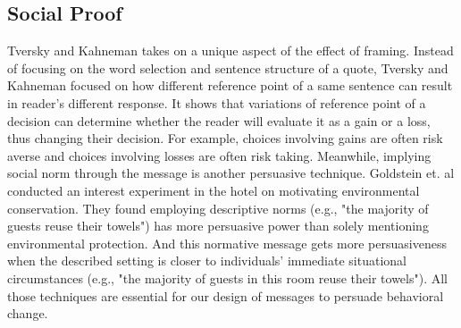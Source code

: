 \subsection{Social Proof}
Tversky and Kahneman takes on a unique aspect of the effect of framing. Instead of focusing on the word selection and sentence structure of a quote, Tversky and Kahneman focused on how different reference point of a same sentence can result in reader's different response. It shows that variations of reference point of a decision can determine whether the reader will evaluate it as a gain or a loss, thus changing their decision. For example, choices involving gains are often risk averse and choices involving losses are often risk taking. Meanwhile, implying social norm through the message is another persuasive technique.  Goldstein et. al conducted an interest experiment in the hotel on motivating environmental conservation. They found employing descriptive norms (e.g., "the majority of guests reuse their towels") has more persuasive power than solely mentioning environmental protection. And this normative message gets more persuasiveness when the described setting is closer to individuals' immediate situational circumstances (e.g., "the majority of guests in this room reuse their towels").  All those techniques are essential for our design of messages to persuade behavioral change.\par

